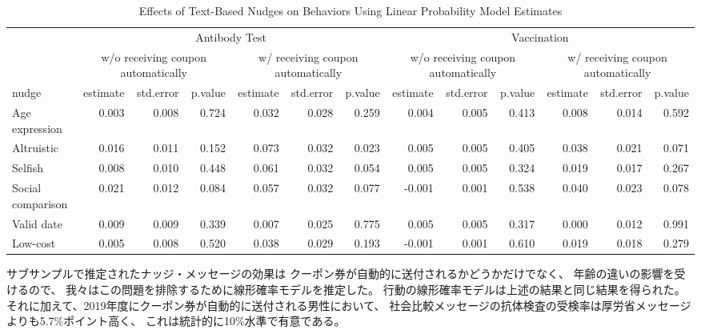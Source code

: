 \documentclass[
  11pt,
  a4paper,
]{article}
\begin{document}
\begin{table}

\caption{\label{tab:act-reg-ftest}Effects of Text-Based Nudges on Behaviors Using Linear Probability Model Estimates}
\centering
\begin{tabular}[t]{lrrrrrrrrrrrr}
\toprule
\multicolumn{1}{c}{ } & \multicolumn{6}{c}{Antibody Test} & \multicolumn{6}{c}{Vaccination} \\
\cmidrule(l{3pt}r{3pt}){2-7} \cmidrule(l{3pt}r{3pt}){8-13}
\multicolumn{1}{c}{ } & \multicolumn{3}{c}{w/o receiving coupon automatically} & \multicolumn{3}{c}{w/ receiving coupon automatically} & \multicolumn{3}{c}{w/o receiving coupon automatically} & \multicolumn{3}{c}{w/ receiving coupon automatically} \\
\cmidrule(l{3pt}r{3pt}){2-4} \cmidrule(l{3pt}r{3pt}){5-7} \cmidrule(l{3pt}r{3pt}){8-10} \cmidrule(l{3pt}r{3pt}){11-13}
nudge & estimate & std.error & p.value & estimate  & std.error  & p.value  & estimate   & std.error   & p.value   & estimate    & std.error    & p.value   \\
\midrule
Age expression & 0.003 & 0.008 & 0.724 & 0.032 & 0.028 & 0.259 & 0.004 & 0.005 & 0.413 & 0.008 & 0.014 & 0.592\\
Altruistic & 0.016 & 0.011 & 0.152 & 0.073 & 0.032 & 0.023 & 0.005 & 0.005 & 0.405 & 0.038 & 0.021 & 0.071\\
Selfish & 0.008 & 0.010 & 0.448 & 0.061 & 0.032 & 0.054 & 0.005 & 0.005 & 0.324 & 0.019 & 0.017 & 0.267\\
Social comparison & 0.021 & 0.012 & 0.084 & 0.057 & 0.032 & 0.077 & -0.001 & 0.001 & 0.538 & 0.040 & 0.023 & 0.078\\
Valid date & 0.009 & 0.009 & 0.339 & 0.007 & 0.025 & 0.775 & 0.005 & 0.005 & 0.317 & 0.000 & 0.012 & 0.991\\
Low-cost & 0.005 & 0.008 & 0.520 & 0.038 & 0.029 & 0.193 & -0.001 & 0.001 & 0.610 & 0.019 & 0.018 & 0.279\\
\bottomrule
\end{tabular}
\end{table}

サブサンプルで推定されたナッジ・メッセージの効果は
クーポン券が自動的に送付されるかどうかだけでなく、
年齢の違いの影響を受けるので、
我々はこの問題を排除するために線形確率モデルを推定した。
行動の線形確率モデルは上述の結果と同じ結果を得られた。
それに加えて、2019年度にクーポン券が自動的に送付される男性において、
社会比較メッセージの抗体検査の受検率は厚労省メッセージよりも5.7\%ポイント高く、
これは統計的に10\%水準で有意である。
\end{document}
